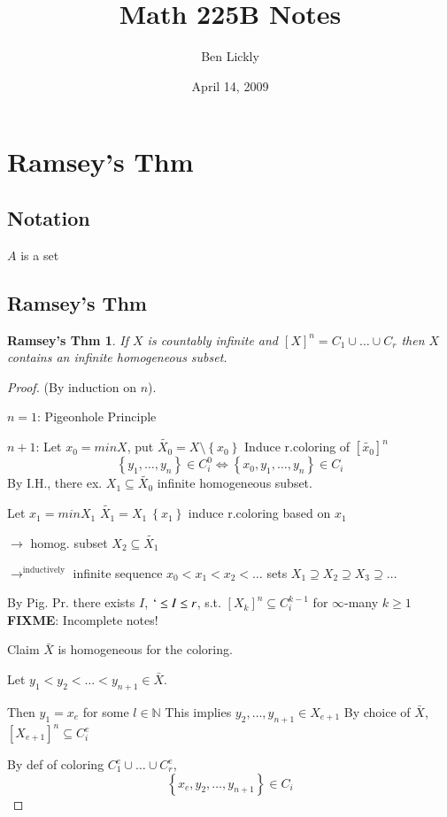 \documentclass[12pt]{article}
\author{Ben Lickly}
\date{April 14, 2009}
\title{Math 225B Notes}
\newcommand{\Nat}{\ensuremath{\mathbb{N}}}
\newcommand{\fixme}{\\ \textbf{FIXME}: Incomplete notes!}
\begin{document}
\maketitle

\section{Ramsey's Thm}
\subsection{Notation}
$A$ is a set

\subsection{Ramsey's Thm}
\newtheorem{ramsey}{Ramsey's Thm}
\begin{ramsey}
  If $X$ is countably infinite and $[X]^n = C_1 \cup \dots \cup C_r$
  then $X$ contains an infinite homogeneous subset.
\end{ramsey}
\begin{proof}
  (By induction on $n$).

  $n=1$: Pigeonhole Principle

  $n+1$: Let $x_0 = min X$, put $\widetilde{X_0} = X \setminus \left\{ x_0 \right\}$
  Induce r.coloring of $[\widetilde{x_0}]^n$
  \[
  \left\{ y_1, \dots, y_n \right\} \in C^0_i \Leftrightarrow \left\{ x_0, y_1, \dots, y_n \right\} \in C_i
  \]
  By I.H., there ex. $X_1 \subseteq \widetilde{X_0}$ infinite homogeneous subset.

  Let $x_1 = min X_1$   $\widetilde{X_1} = X_1 \ \left\{ x_1 \right\}$
  induce r.coloring based on $x_1$

  $\rightarrow$ homog. subset $X_2 \subseteq \widetilde{X_1}$
  
  $\rightarrow^\text{inductively}$ infinite sequence $x_0 < x_1 < x_2 < \dots$
  sets $X_1 \supseteq X_2 \supseteq X_3 \supseteq \dots$

  By Pig. Pr. there exists $I$, $` \le I \le r$, s.t.
  $\left[ X_k \right]^n \subseteq C^{k-1}_i$ for $\infty$-many $k \ge 1$
  \fixme

  Claim $\bar{X}$ is homogeneous for the coloring.

  Let $y_1 < y_2 < \dots < y_{n+1} \in \bar{X}$.

  Then $y_1 = x_e$ for some $l \in \Nat$
  This implies $y_2 , \dots, y_{n+1} \in X_{e+1}$
  By choice of $\bar{X}$, $\left[ X_{e+1} \right]^n \subseteq C^e_i$

  By def of coloring $C^e_1 \cup \dots \cup C^e_r$, 
  \[
  \left\{ x_e, y_2, \dots, y_{n+1} \right\} \in C_i
  \]
\end{proof}
\end{document}

